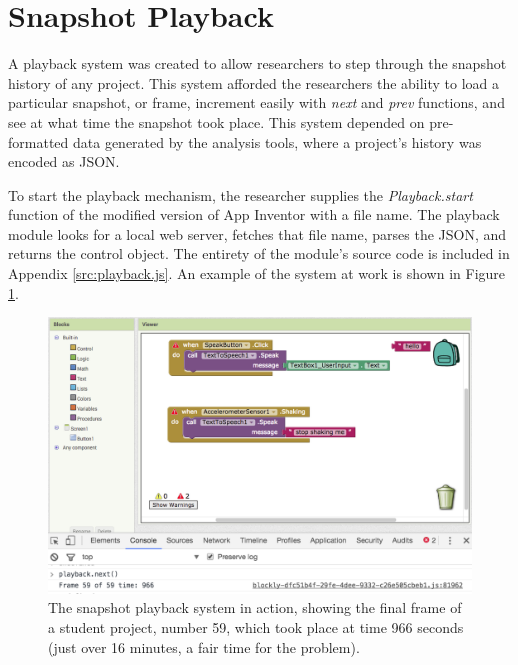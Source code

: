 \section{Snapshot Playback}
\label{sec:playback}

A playback system was created to allow researchers to step through the snapshot history of any project. This system afforded the researchers the ability to load a particular snapshot, or frame, increment easily with \emph{next} and \emph{prev} functions, and see at what time the snapshot took place. This system depended on pre-formatted data generated by the analysis tools, where a project's history was encoded as JSON.

To start the playback mechanism, the researcher supplies the \emph{Playback.start} function of the modified version of App Inventor with a file name. The playback module looks for a local web server, fetches that file name, parses the JSON, and returns the control object. The entirety of the module's source code is included in Appendix \ref{src:playback.js}. An example of the system at work is shown in Figure \ref{img:playback}.

\begin{figure}
  \centering
      \includegraphics[width=\textwidth]{images/ch3-playback}
  \caption[Snapshot playback]{The snapshot playback system in action, showing the final frame of a student project, number 59, which took place at time 966 seconds (just over 16 minutes, a fair time for the problem).}
  \label{img:playback}
\end{figure}



